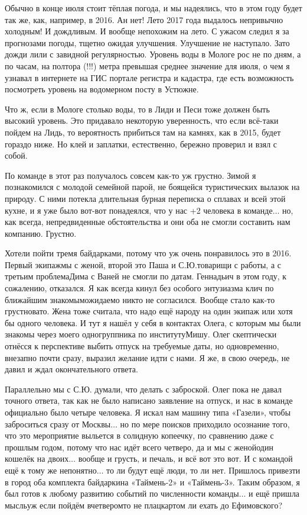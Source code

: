 Обычно в конце июля стоит тёплая погода, и мы надеялись, что в этом году будет так же, как, например, в 2016. Ан нет! Лето 2017 года выдалось непривычно холодным! И дождливым. И вообще непохожим на лето. С ужасом следил я за прогнозами погоды, тщетно ожидая улучшения. Улучшение не наступало. Зато дожди лили с завидной регулярностью. Уровень воды в Мологе рос не по дням, а по часам, на полтора (!!!) метра превышая среднее значение для июля, о чем я узнавал в интернете на ГИС портале регистра и кадастра, где есть возможность посмотреть уровень на водомерном посту в Устюжне. 

Что ж, если в Мологе столько воды, то в Лиди и Песи тоже должен быть высокий уровень. Это придавало некоторую уверенность, что если всё-таки пойдем на Лидь, то вероятность прибиться там на камнях, как в 2015, будет гораздо ниже. Но клей и заплатки, естественно, бережно проверил и взял с собой.

По команде в этот раз получалось совсем как-то уж грустно. Зимой я познакомился с молодой семейной парой, не боящейся туристических вылазок на природу. С ними потекла длительная бурная переписка о сплавах и всей этой кухне, и я уже было вот-вот понадеялся, что у нас +2 человека в команде$\ldots$ но, как всегда, непредвиденные обстоятельства и они оба не смогли составить нам компанию. Грустно. 

Хотели пойти тремя байдарками, потому что уж очень понравилось это в 2016. Первый экипаж\mdash мы с женой, второй это Паша и С.Ю.\mdash товарищи с работы, а с третьим проблема\mdash Дима с Ваней не смогли по датам. Геннадьич в этом году, к сожалению, отказался. Я как всегда кинул без особого энтузиазма клич по ближайшим знакомым\mdash ожидаемо никто не согласился. Вообще стало как-то грустновато. Жена тоже считала, что надо ещё народу на один экипаж или хотя бы одного человека. И тут я нашёл у себя в контактах Олега, с которым мы были знакомы через моего одногруппника по институту\mdash Мишу. Олег скептически отнёсся к перспективе выбить отпуск на требуемые даты, но одновременно, внезапно почти сразу, выразил желание идти с нами. Я же, в свою очередь, не давил и ждал окончательного ответа. 

Параллельно мы с С.Ю. думали, что делать с заброской. Олег пока не давал точного ответа, так как не было написано заявление на отпуск, и нас в команде официально было четыре человека. Я искал нам машину типа «Газели», чтобы заброситься сразу от Москвы$\ldots$ но по мере поисков приходило осознание того, что это мероприятие выльется в солидную копеечку, по сравнению даже с прошлым годом, потому что нас идёт всего четверо, да и мы с женой\mdash один кошелёк на двоих$\ldots$ вообще и грусть, и печаль, и всё вот это вот. И с командой ещё к тому же непонятно$\ldots$ то ли будут ещё люди, то ли нет. Пришлось привезти в город оба комплекта байдарки\mdash на «Таймень-2» и «Таймень-3». Таким образом, я был готов к любому развитию событий по численности команды$\ldots$ и ещё пришла мысль\mdash уж если пойдём вчетвером\mdash то не плацкартом ли ехать до Ефимовского?

